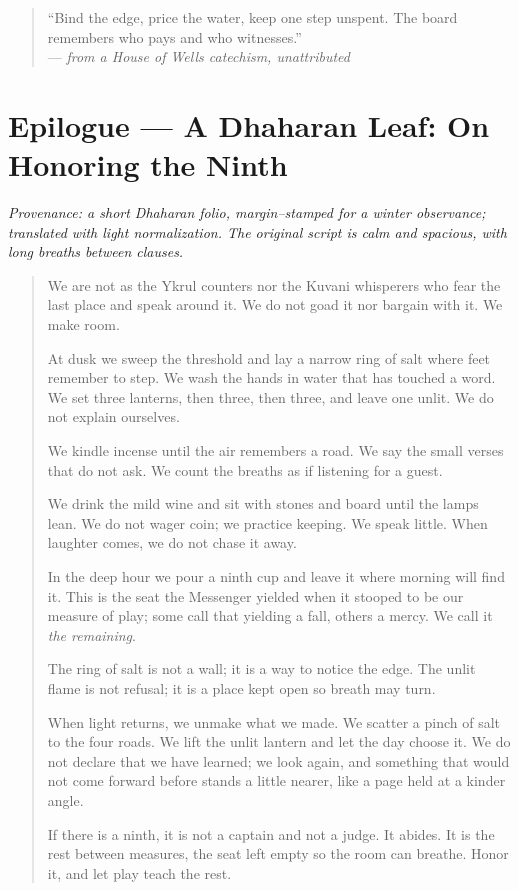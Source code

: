 \documentclass[11pt]{article}
\numberwithin{equation}{section} %
\theoremstyle{plain} %
\theoremstyle{definition} %
\theoremstyle{remark} %
\begin{document}
\medskip
\begin{quote}\small
“Bind the edge, price the water, keep one step unspent. The board remembers who pays and who witnesses.”\\
\hfill — \textit{from a House of Wells catechism, unattributed}
\end{quote}


\clearpage
\section*{Epilogue — A Dhaharan Leaf: On Honoring the Ninth}
\label{epilogue:dhahara-ninth}
{}

\noindent\textit{Provenance: a short Dhaharan folio, margin–stamped for a winter observance; translated with light normalization. The original script is calm and spacious, with long breaths between clauses.}

\medskip
\begin{quote}\small
We are not as the Ykrul counters nor the Kuvani whisperers who fear the last place and speak around it. We do not goad it nor bargain with it. We make room.

At dusk we sweep the threshold and lay a narrow ring of salt where feet remember to step. We wash the hands in water that has touched a word. We set three lanterns, then three, then three, and leave one unlit. We do not explain ourselves.

We kindle incense until the air remembers a road. We say the small verses that do not ask. We count the breaths as if listening for a guest.

We drink the mild wine and sit with stones and board until the lamps lean. We do not wager coin; we practice keeping. We speak little. When laughter comes, we do not chase it away.

In the deep hour we pour a ninth cup and leave it where morning will find it. This is the seat the Messenger yielded when it stooped to be our measure of play; some call that yielding a fall, others a mercy. We call it \emph{the remaining}.

The ring of salt is not a wall; it is a way to notice the edge. The unlit flame is not refusal; it is a place kept open so breath may turn.

When light returns, we unmake what we made. We scatter a pinch of salt to the four roads. We lift the unlit lantern and let the day choose it. We do not declare that we have learned; we look again, and something that would not come forward before stands a little nearer, like a page held at a kinder angle.

If there is a ninth, it is not a captain and not a judge. It abides. It is the rest between measures, the seat left empty so the room can breathe. Honor it, and let play teach the rest.
\end{quote}
\end{document}

